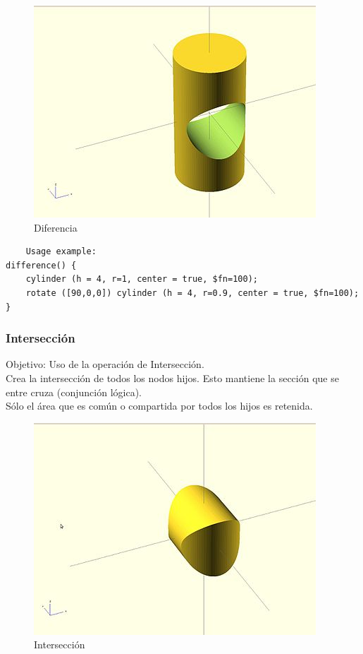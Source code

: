 \documentclass{article}
\begin{document}
\begin{figure}[ht!]
    \centering
    \includegraphics[scale=0.25]{Imagenes/Openscad_difference.jpg}
    \caption{Diferencia}
    \label{fig:difOpenscad}
\end{figure}

\begin{verbatim}
    Usage example:
difference() {
	cylinder (h = 4, r=1, center = true, $fn=100);
	rotate ([90,0,0]) cylinder (h = 4, r=0.9, center = true, $fn=100);
}
\end{verbatim}


\subsubsection{Intersección}

Objetivo: Uso de la operación de Intersección.\citep{OpenSCS}\\

Crea la intersección de todos los nodos hijos.
Esto mantiene la sección que se entre cruza (conjunción lógica).\citep{WikiOpensCAD}\\

Sólo el área que es común o compartida por todos los hijos es retenida.\citep{WikiOpensCAD}\\

\begin{figure}[ht!]
    \centering
    \includegraphics[scale=0.25]{Imagenes/Openscad_intersection.jpg}
    \caption{Intersección}
    \label{fig:my_label}
\end{figure}
\end{document}
